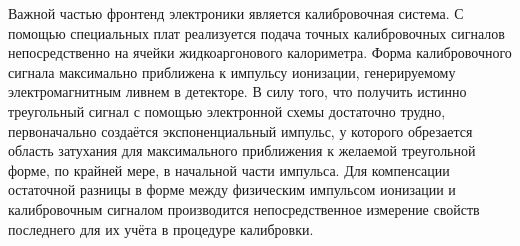Важной частью фронтенд электроники является калибровочная система. С помощью специальных плат реализуется подача точных калибровочных сигналов непосредственно на ячейки жидкоаргонового калориметра. Форма калибровочного сигнала максимально приближена к импульсу ионизации, генерируемому электромагнитным ливнем в детекторе. В силу того, что получить истинно треугольный сигнал с помощью электронной схемы достаточно трудно, первоначально создаётся экспоненциальный импульс, у которого обрезается область затухания для максимального приближения к желаемой треугольной форме, по крайней мере, в начальной части импульса. Для компенсации остаточной разницы в форме между физическим импульсом ионизации и калибровочным сигналом производится непосредственное измерение свойств последнего для их учёта в процедуре калибровки.\par

